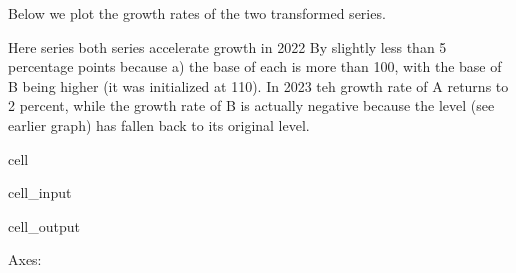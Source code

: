\documentclass[letterpaper,10pt,english]{jupyterBook}
\begin{document}
\sphinxAtStartPar
Below we plot the growth rates of the two transformed series.

\sphinxAtStartPar
Here series both series accelerate growth in 2022 By slightly less than 5 percentage points because a) the base of each is more than 100, with the base of B being higher (it was initialized at 110). In 2023 teh growth rate of A returns to 2 percent, while the growth rate of B is actually negative because the level (see earlier graph) has fallen back to its original level.

\begin{sphinxuseclass}{cell}\begin{sphinxVerbatimInput}

\begin{sphinxuseclass}{cell_input}
\begin{sphinxVerbatim}[commandchars=\\\{\}]
\PYG{p}{[}\PYG{p}{[}\PYG{p}{]}\PYG{p}{]}
\end{sphinxVerbatim}

\end{sphinxuseclass}\end{sphinxVerbatimInput}
\begin{sphinxVerbatimOutput}

\begin{sphinxuseclass}{cell_output}
\begin{sphinxVerbatim}[commandchars=\\\{\}]
\PYGZlt{}Axes: \PYGZgt{}
\end{sphinxVerbatim}

\noindent{}

\end{sphinxuseclass}\end{sphinxVerbatimOutput}

\end{sphinxuseclass}
\end{document}
